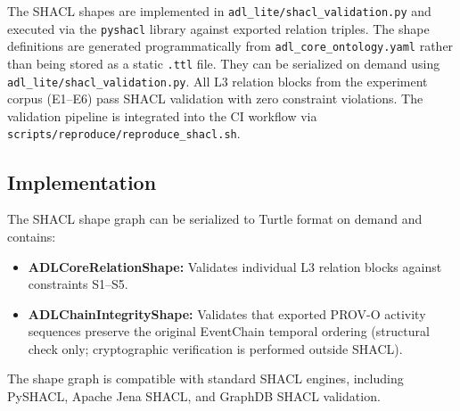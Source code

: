 The SHACL shapes are implemented in \texttt{adl\_lite/shacl\_validation.py} and executed via the \texttt{pyshacl} library against exported relation triples. The shape definitions are generated programmatically from \texttt{adl\_core\_ontology.yaml} rather than being stored as a static \texttt{.ttl} file. They can be serialized on demand using \texttt{adl\_lite/shacl\_validation.py}.
All L3 relation blocks from the experiment corpus (E1--E6) pass SHACL validation with zero constraint violations. The validation pipeline is integrated into the CI workflow via \texttt{scripts/reproduce/reproduce\_shacl.sh}.

\subsection{Implementation}

The SHACL shape graph can be serialized to Turtle format on demand and contains:
\begin{itemize}[leftmargin=2em]
    \item \textbf{ADLCoreRelationShape:} Validates individual L3 relation blocks against constraints S1--S5.
    \item \textbf{ADLChainIntegrityShape:} Validates that exported PROV-O activity sequences preserve the original EventChain temporal ordering (structural check only; cryptographic verification is performed outside SHACL).
\end{itemize}
The shape graph is compatible with standard SHACL engines, including PySHACL, Apache Jena SHACL, and GraphDB SHACL validation.
